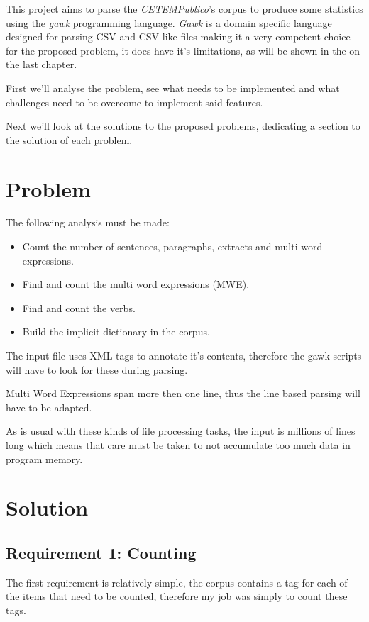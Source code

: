 \documentclass[a4paper]{report}
\begin{document}
This project aims to parse the \textit{CETEMPublico}'s corpus to produce some
statistics using the \textit{gawk} programming language. \textit{Gawk} is a
domain specific language designed for parsing CSV and CSV-like files making it
a very competent choice for the proposed problem, it does have it's
limitations, as will be shown in the on the last chapter.

First we'll analyse the problem, see what needs to be implemented and what
challenges need to be overcome to implement said features.

Next we'll look at the solutions to the proposed problems, dedicating a
section to the solution of each problem.

\chapter{Problem}

The following analysis must be made:
\begin{itemize}
    \item Count the number of sentences, paragraphs, extracts and
        multi word expressions.
    \item Find and count the multi word expressions (MWE).
    \item Find and count the verbs.
    \item Build the implicit dictionary in the corpus.
\end{itemize}

The input file uses XML tags to annotate it's contents, therefore the gawk
scripts will have to look for these during parsing.

Multi Word Expressions span more then one line, thus the line based parsing
will have to be adapted.

As is usual with these kinds of file processing tasks, the input is millions of
lines long which means that care must be taken to not accumulate too much data
in program memory.

\chapter{Solution}

\section{Requirement 1: Counting}\label{sec:count}

The first requirement is relatively simple, the corpus contains a tag for each
of the items that need to be counted, therefore my job was simply to count
these tags.
\end{document}
